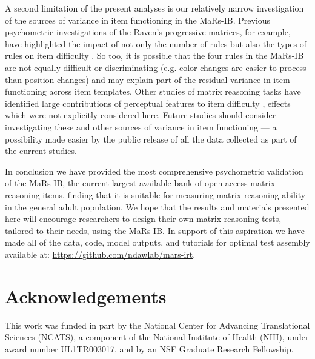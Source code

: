 \documentclass[a4paper,man,natbib]{apa6}
\begin{document}
A second limitation of the present analyses is our relatively narrow investigation of the sources of variance in item functioning in the MaRs-IB. Previous psychometric investigations of the Raven's progressive matrices, for example, have highlighted the impact of not only the number of rules but also the types of rules on item difficulty \citep{carpenter1990one, embretson1998cognitive}. So too, it is possible that the four rules in the MaRs-IB are not equally difficult or discriminating (e.g. color changes are easier to process than position changes) and may explain part of the residual variance in item functioning across item templates. Other studies of matrix reasoning tasks have identified large contributions of perceptual features to item difficulty \citep{primi2001complexity, primi2014developing}, effects which were not explicitly considered here. Future studies should consider investigating these and other sources of variance in item functioning --- a possibility made easier by the public release of all the data collected as part of the current studies.

In conclusion we have provided the most comprehensive psychometric validation of the MaRs-IB, the current largest available bank of open access matrix reasoning items, finding that it is suitable for measuring matrix reasoning ability in the general adult population. We hope that the results and materials presented here will encourage researchers to design their own matrix reasoning tests, tailored to their needs, using the MaRs-IB. In support of this aspiration we have made all of the data, code, model outputs, and tutorials for optimal test assembly available at: \url{https://github.com/ndawlab/mars-irt}.

\section{Acknowledgements}
\noindent This work was funded in part by the National Center for Advancing Translational Sciences (NCATS), a component of the National Institute of Health (NIH), under award number UL1TR003017, and by an NSF Graduate Research Fellowship.


\end{document}
